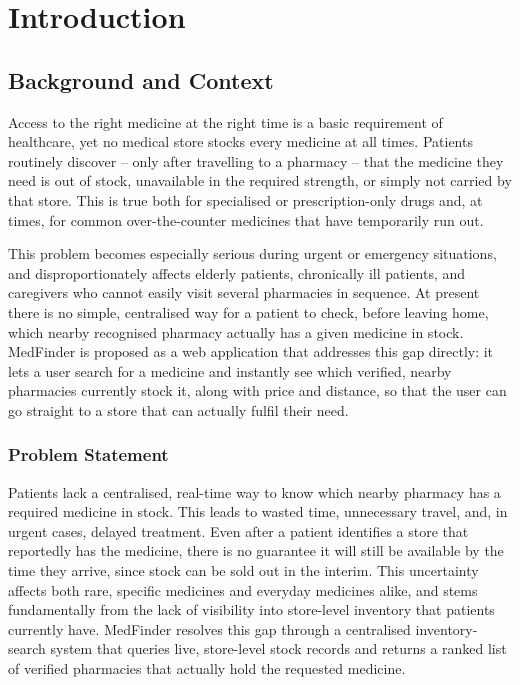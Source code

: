 \documentclass[11pt,a4paper]{report}
\begin{document}
\tableofcontents
\thispagestyle{empty}
\newpage

\chapter{Introduction}

\section{Background and Context}

Access to the right medicine at the right time is a basic requirement of healthcare, yet no medical store stocks every medicine at all times. Patients routinely discover -- only after travelling to a pharmacy -- that the medicine they need is out of stock, unavailable in the required strength, or simply not carried by that store. This is true both for specialised or prescription-only drugs and, at times, for common over-the-counter medicines that have temporarily run out.

This problem becomes especially serious during urgent or emergency situations, and disproportionately affects elderly patients, chronically ill patients, and caregivers who cannot easily visit several pharmacies in sequence. At present there is no simple, centralised way for a patient to check, before leaving home, which nearby recognised pharmacy actually has a given medicine in stock. MedFinder is proposed as a web application that addresses this gap directly: it lets a user search for a medicine and instantly see which verified, nearby pharmacies currently stock it, along with price and distance, so that the user can go straight to a store that can actually fulfil their need.

\subsection{Problem Statement}

Patients lack a centralised, real-time way to know which nearby pharmacy has a required medicine in stock. This leads to wasted time, unnecessary travel, and, in urgent cases, delayed treatment. Even after a patient identifies a store that reportedly has the medicine, there is no guarantee it will still be available by the time they arrive, since stock can be sold out in the interim. This uncertainty affects both rare, specific medicines and everyday medicines alike, and stems fundamentally from the lack of visibility into store-level inventory that patients currently have. MedFinder resolves this gap through a centralised inventory-search system that queries live, store-level stock records and returns a ranked list of verified pharmacies that actually hold the requested medicine.
\end{document}

